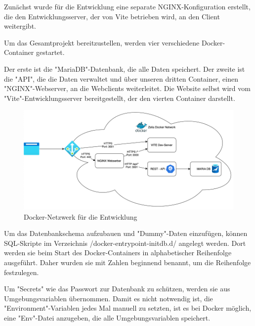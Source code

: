 
Zunächst wurde für die Entwicklung eine separate NGINX-Konfiguration erstellt, die den Entwicklungsserver, der von Vite betrieben wird, an den Client weitergibt.


Um das Gesamtprojekt bereitzustellen, werden vier verschiedene Docker-Container gestartet.

Der erste ist die "MariaDB"-Datenbank, die alle Daten speichert. Der zweite ist die "API", die die Daten verwaltet und über unseren dritten Container, einen "NGINX"-Webserver, an die Webclients weiterleitet. Die Website selbst wird vom "Vite"-Entwicklungsserver bereitgestellt, der den vierten Container darstellt. 

\begin{figure}[H]
    \centering
    \includegraphics{media/Docker/DevNetwork.png}
    \caption{Docker-Netzwerk für die Entwicklung}
\end{figure}

Um das Datenbankschema aufzubauen und "Dummy"-Daten einzufügen, können SQL-Skripte im Verzeichnis /docker-entrypoint-initdb.d/ angelegt werden. Dort werden sie beim Start des Docker-Containers in alphabetischer Reihenfolge ausgeführt. Daher wurden sie mit Zahlen beginnend benannt, um die Reihenfolge festzulegen.

Um "Secrets" wie das Passwort zur Datenbank zu schützen, werden sie aus Umgebungsvariablen übernommen. Damit es nicht notwendig ist, die "Environment"-Variablen jedes Mal manuell zu setzten, ist es bei Docker möglich, eine "Env"-Datei anzugeben, die alle Umgebungsvariablen speichert. 
